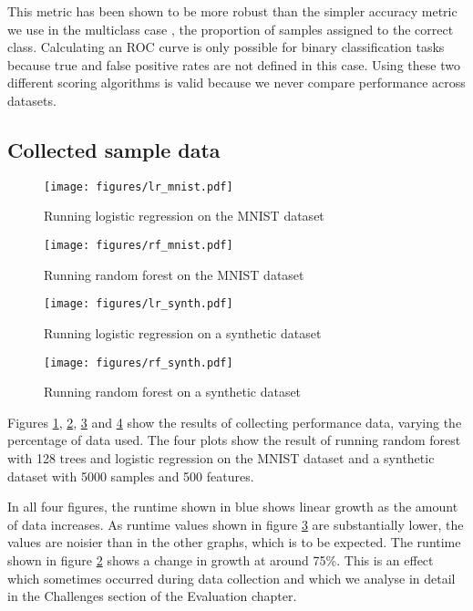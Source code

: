 \documentclass[a4paper,12pt,twoside,openright]{report}
\begin{document}
This metric has been shown to be more robust than the simpler accuracy metric we use in the multiclass case \cite{Bradley97theuse}, the proportion of samples assigned to the correct class. Calculating an ROC curve is only possible for binary classification tasks because true and false positive rates are not defined in this case. Using these two different scoring algorithms is valid because we never compare performance across datasets.




\subsection{Collected sample data}

\begin{figure}
\centering
  \texttt{[image: figures/lr\_mnist.pdf]}
  \caption{Running logistic regression on the MNIST dataset}
  \label{sampledata1}
\end{figure}

\begin{figure}
\centering
  \texttt{[image: figures/rf\_mnist.pdf]}
  \caption{Running random forest on the MNIST dataset}
  \label{sampledata2}
\end{figure}

\begin{figure}
\centering
  \texttt{[image: figures/lr\_synth.pdf]}
  \caption{Running logistic regression on a synthetic dataset}
  \label{sampledata3}
\end{figure}

\begin{figure}
\centering
  \texttt{[image: figures/rf\_synth.pdf]}
  \caption{Running random forest on a synthetic dataset}
  \label{sampledata4}
\end{figure}

Figures \ref{sampledata1}, \ref{sampledata2}, \ref{sampledata3} and \ref{sampledata4} show the results of collecting performance data, varying the percentage of data used. The four plots show the result of running random forest with 128 trees and logistic regression on the MNIST dataset and a synthetic dataset with 5000 samples and 500 features.

In all four figures, the runtime shown in blue shows linear growth as the amount of data increases. As runtime values shown in figure \ref{sampledata3} are substantially lower, the values are noisier than in the other graphs, which is to be expected. The runtime shown in figure \ref{sampledata2} shows a change in growth at around 75\%. This is an effect which sometimes occurred during data collection and which we analyse in detail in the Challenges section of the Evaluation chapter.
\end{document}
